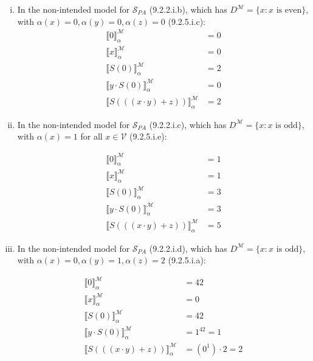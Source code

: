 \begin{enumerate}[\thesection.1]
\begin{enumerate}[(i)]
			\item In the non-intended model for $\mathcal{S}_{PA}$ (9.2.2.i.b), which has $D^\mathcal{M}=\{x:x\text{ is even}\}$, with $\alpha(x)=0,\alpha(y)=0,\alpha(z)=0$ (9.2.5.i.c):
			\begin{align*}
			\llbracket 0\rrbracket^\mathcal{M}_\alpha&=0\\
			\llbracket x\rrbracket^\mathcal{M}_\alpha&=0\\
			\llbracket S(0)\rrbracket^\mathcal{M}_\alpha&=2\\
			\llbracket y\cdot S(0)\rrbracket^\mathcal{M}_\alpha&=0\\
			\llbracket S(((x\cdot y)+z))\rrbracket^\mathcal{M}_\alpha&=2
			\end{align*}
			
			\item In the non-intended model for $\mathcal{S}_{PA}$ (9.2.2.i.c), which has $D^\mathcal{M}=\{x:x\text{ is odd}\}$, with $\alpha(x)=1$ for all $x\in\mathcal{V}$ (9.2.5.i.e):
			
			\begin{align*}
			\llbracket 0\rrbracket^\mathcal{M}_\alpha&=1\\
			\llbracket x\rrbracket^\mathcal{M}_\alpha&=1\\
			\llbracket S(0)\rrbracket^\mathcal{M}_\alpha&=3\\
			\llbracket y\cdot S(0)\rrbracket^\mathcal{M}_\alpha&=3\\
			\llbracket S(((x\cdot y)+z))\rrbracket^\mathcal{M}_\alpha&=5
			\end{align*}
			
			\item In the non-intended model for $\mathcal{S}_{PA}$ (9.2.2.i.d), which has $D^\mathcal{M}=\{x:x\text{ is odd}\}$, with $\alpha(x)=0,\alpha(y)=1,\alpha(z)=2$ (9.2.5.i.a):
			
			\begin{align*}
			\llbracket 0\rrbracket^\mathcal{M}_\alpha&=42\\
			\llbracket x\rrbracket^\mathcal{M}_\alpha&=0\\
			\llbracket S(0)\rrbracket^\mathcal{M}_\alpha&=42\\
			\llbracket y\cdot S(0)\rrbracket^\mathcal{M}_\alpha&=1^{42}=1\\
			\llbracket S(((x\cdot y)+z))\rrbracket^\mathcal{M}_\alpha&=(0^1)\cdot 2=2
			\end{align*}
			

\end{enumerate}
\end{enumerate}
